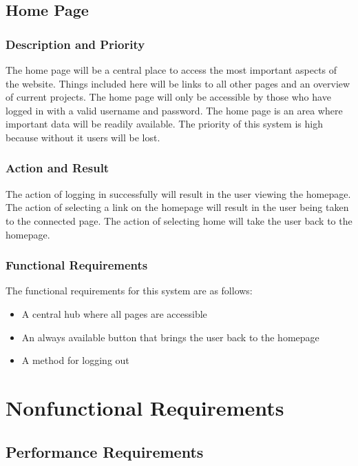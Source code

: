 \documentclass[letterpaper,10pt,titlepage,journal,compsoc,draftclsnofoot,onecolumn]{IEEEtran}
\begin{document}
\subsection{Home Page}

\subsubsection{Description and Priority}

The home page will be a central place to access the most important aspects of the website. Things included here will be links to all other pages and an overview of current projects. The home page will only be accessible by those who have logged in with a valid username and password. The home page is an area where important data will be readily available. The priority of this system is high because without it users will be lost.

\subsubsection{Action and Result}

The action of logging in successfully will result in the user viewing the homepage. The action of selecting a link on the homepage will result in the user being taken to the connected page. The action of selecting home will take the user back to the homepage. 

\subsubsection{Functional Requirements}

The functional requirements for this system are as follows:
\begin{itemize}
\item A central hub where all pages are accessible
\item An always available button that brings the user back to the homepage
\item A method for logging out
\end{itemize}

\section{Nonfunctional Requirements}

\subsection{Performance Requirements}
\end{document}
